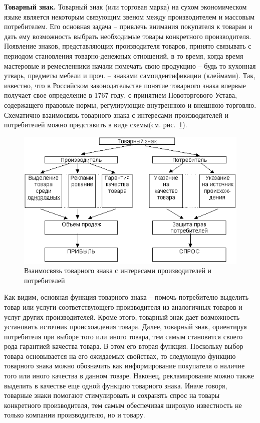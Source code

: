  \textbf{Товарный знак.} Товарный знак (или торговая марка) на сухом
  экономическом языке является некоторым связующим звеном между производителем
  и массовым потребителем. Его основная задача -- привлечь внимания покупателя к
  товарам и дать ему возможность выбрать необходимые товары конкретного
  производителя. Появление знаков, представляющих производителя товаров,
  принято связывать с периодом становления товарно-денежных отношений, в то
  время, когда время мастеровые и ремесленники начали помечать свою продукцию --
  будь то кухонная утварь, предметы мебели и проч. -- знаками
  самоидентификации (клеймами). Так, известно, что в Российском законодательстве
  понятие товарного знака впервые получает свое определение  в 1767 году,
  с принятием Новоторгового Устава, содержащего правовые нормы,
  регулирующие внутреннюю и внешнюю торговлю\autocite{pantuhinaAM}.
  Схематично взаимосвязь товарного знака с интересами производителей и
  потребителей можно представить в виде схемы(см. рис.~\ref{fig:pantuhina}).
  \begin{figure}[h!]
  \centering
  \includegraphics[width=.7\linewidth]{images/pantuhina}
  \caption{Взаимосвязь товарного знака с интересами производителей и потребителей}
  \label{fig:pantuhina}
\end{figure}

  Как видим, основная функция товарного знака -- помочь потребителю выделить
  товар или услуги соответствующего производителя из аналогичных товаров и услуг
  других производителей. Кроме этого, товарный знак дает возможность установить
  источник происхождения товара. Далее, товарный знак, ориентируя потребителя
  при выборе того или иного товара, тем самым становится своего рода гарантией
  качества товара. В этом его вторая функция. Поскольку выбор товара основывается
  на его ожидаемых свойствах, то следующую функцию товарного знака можно обозначить
  как информирование покупателя о наличие того или иного качества в данном товаре.
  Наконец, рекламирование можно также выделить в качестве еще одной функцию
  товарного знака. Иначе говоря, товарные знаки помогают стимулировать и
  сохранять спрос на товары конкретного производителя, тем самым обеспечивая
  широкую известность не только компании производителю, но и товару.

